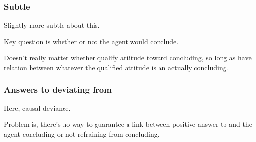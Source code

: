\subsubsection{Subtle}
\label{sec:subtle}


\begin{note}
  Slightly more subtle about this.

  Key question is whether or not the agent would conclude.

  Doesn't really matter whether qualify attitude toward concluding, so long as have relation between whatever the qualified attitude is an actually concluding.
\end{note}

\subsubsection{Answers to \qzS{} deviating from \qWhy{}}
\label{sec:probl-link-prop}

\begin{note}
  Here, causal deviance.
\end{note}

\begin{note}
  Problem is, there's no way to guarantee a link between positive answer to \qzS{} and the agent concluding or not refraining from concluding.
\end{note}

